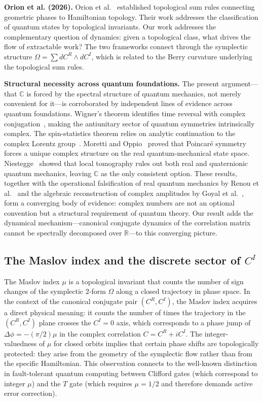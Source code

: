 \documentclass[aps,pra,preprint,groupedaddress,amsmath,amssymb,floatfix]{revtex4-2}
\begin{document}
\textbf{Orion et al. (2026).} Orion et al.~\cite{orion2026} established topological sum rules connecting geometric phases to Hamiltonian topology. Their work addresses the classification of quantum states by topological invariants. Our work addresses the complementary question of dynamics: given a topological class, what drives the flow of extractable work? The two frameworks connect through the symplectic structure $\Omega = \sum dC^R \wedge dC^I$, which is related to the Berry curvature underlying the topological sum rules.

\textbf{Structural necessity across quantum foundations.} The present argument---that $\mathbb{C}$ is forced by the spectral structure of quantum mechanics, not merely convenient for it---is corroborated by independent lines of evidence across quantum foundations. Wigner's theorem identifies time reversal with complex conjugation~\cite{wigner1931}, making the antiunitary sector of quantum symmetries intrinsically complex. The spin-statistics theorem relies on analytic continuation to the complex Lorentz group~\cite{streater1964}. Moretti and Oppio~\cite{moretti2017} proved that Poincar\'e symmetry forces a unique complex structure on the real quantum-mechanical state space. Niestegge~\cite{niestegge2020} showed that local tomography rules out both real and quaternionic quantum mechanics, leaving $\mathbb{C}$ as the only consistent option. These results, together with the operational falsification of real quantum mechanics by Renou et al.~\cite{renou2021} and the algebraic reconstruction of complex amplitudes by Goyal et al.~\cite{goyal2010}, form a converging body of evidence: complex numbers are not an optional convention but a structural requirement of quantum theory. Our result adds the dynamical mechanism---canonical conjugate dynamics of the correlation matrix cannot be spectrally decomposed over $\mathbb{R}$---to this converging picture.

\subsection{The Maslov index and the discrete sector of $C^I$}

The Maslov index $\mu$ is a topological invariant that counts the number of sign changes of the symplectic $2$-form $\Omega$ along a closed trajectory in phase space. In the context of the canonical conjugate pair $(C^R, C^I)$, the Maslov index acquires a direct physical meaning: it counts the number of times the trajectory in the $(C^R, C^I)$ plane crosses the $C^I = 0$ axis, which corresponds to a phase jump of $\Delta\phi = -(\pi/2)\mu$ in the complex correlation $C = C^R + iC^I$. The integer-valuedness of $\mu$ for closed orbits implies that certain phase shifts are topologically protected: they arise from the geometry of the symplectic flow rather than from the specific Hamiltonian. This observation connects to the well-known distinction in fault-tolerant quantum computing between Clifford gates (which correspond to integer $\mu$) and the $T$ gate (which requires $\mu = 1/2$ and therefore demands active error correction).
\end{document}
